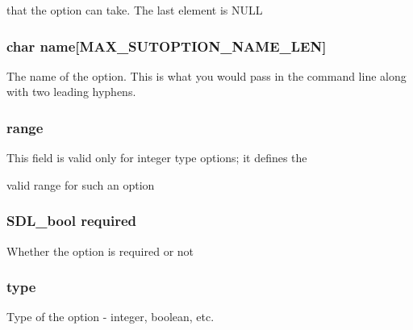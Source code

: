  that the option can take. The last element is N\-U\-L\-L \hypertarget{struct_s_d_l_visual_test___s_u_t_option_ad14ca616d8f7c9b61eff58baaead7f1f}{
\subsubsection[{name}]{\setlength{\rightskip}{0pt plus 5cm}char name\mbox{[}{\bf M\-A\-X\-\_\-\-S\-U\-T\-O\-P\-T\-I\-O\-N\-\_\-\-N\-A\-M\-E\-\_\-\-L\-E\-N}\mbox{]}}}\label{struct_s_d_l_visual_test___s_u_t_option_ad14ca616d8f7c9b61eff58baaead7f1f}
The name of the option. This is what you would pass in the command line along with two leading hyphens. \hypertarget{struct_s_d_l_visual_test___s_u_t_option_a2bb1301268866e0e41d035ea0a4914e8}{
\subsubsection[{range}]{ range}}\label{struct_s_d_l_visual_test___s_u_t_option_a2bb1301268866e0e41d035ea0a4914e8}
\begin{DoxyVerb}This field is valid only for integer type options; it defines the
\end{DoxyVerb}
 valid range for such an option \hypertarget{struct_s_d_l_visual_test___s_u_t_option_a79305c1b10f7b4defee52e1eefde8fbc}{
\subsubsection[{required}]{\setlength{\rightskip}{0pt plus 5cm}S\-D\-L\-\_\-bool required}}\label{struct_s_d_l_visual_test___s_u_t_option_a79305c1b10f7b4defee52e1eefde8fbc}
Whether the option is required or not \hypertarget{struct_s_d_l_visual_test___s_u_t_option_a857b9e5ccfca26034b47a5f3236d822c}{
\subsubsection[{type}]{ type}}\label{struct_s_d_l_visual_test___s_u_t_option_a857b9e5ccfca26034b47a5f3236d822c}
Type of the option -\/ integer, boolean, etc. 

